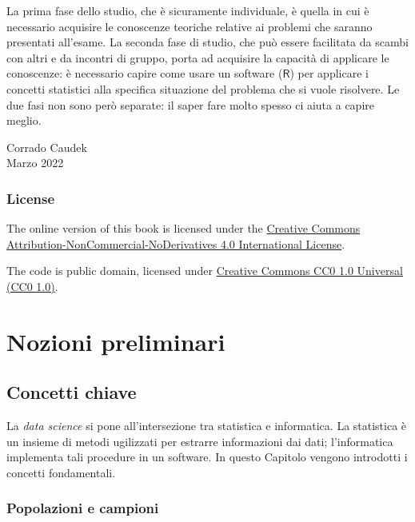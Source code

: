 \documentclass[
]{book}
\theoremstyle{definition}
\theoremstyle{definition}
\theoremstyle{definition}
\theoremstyle{definition}
\theoremstyle{remark}
\begin{document}
La prima fase dello studio, che è sicuramente individuale, è quella in cui è necessario acquisire le conoscenze teoriche relative ai problemi che saranno presentati all'esame. La seconda fase di studio, che può essere facilitata da scambi con altri e da incontri di gruppo, porta ad acquisire la capacità di applicare le conoscenze: è necessario capire come usare un software (\(\textsf{R}\)) per applicare i concetti statistici alla specifica situazione del problema che si vuole risolvere. Le due fasi non sono però separate: il saper fare molto spesso ci aiuta a capire meglio.

\begin{flushright}
Corrado Caudek\\
Marzo 2022
\end{flushright}

\hypertarget{license}{%
\section*{License}\label{license}}

The online version of this book is licensed under the \href{https://creativecommons.org/licenses/by-nc-nd/4.0/}{Creative Commons Attribution-NonCommercial-NoDerivatives 4.0 International License}.

The code is public domain, licensed under \href{https://creativecommons.org/publicdomain/zero/1.0/}{Creative Commons CC0 1.0 Universal (CC0 1.0)}.

\mainmatter

\hypertarget{part-nozioni-preliminari}{%
\part{Nozioni preliminari}\label{part-nozioni-preliminari}}

\hypertarget{ch-key-notions}{%
\chapter{Concetti chiave}\label{ch-key-notions}}

La \emph{data science} si pone all'intersezione tra statistica e informatica. La statistica è un insieme di metodi ugilizzati per estrarre informazioni dai dati; l'informatica implementa tali procedure in un software. In questo Capitolo vengono introdotti i concetti fondamentali.

\hypertarget{popolazioni-e-campioni}{%
\section{Popolazioni e campioni}\label{popolazioni-e-campioni}}
\end{document}
